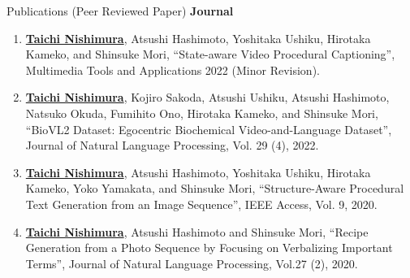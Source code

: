 \begin{rSection}{Publications (Peer Reviewed Paper)} 
{\bf Journal}
\vspace{-0.15cm}
\begin{enumerate}
    \item \underline{{\bf Taichi Nishimura}}, Atsushi Hashimoto, Yoshitaka Ushiku, Hirotaka Kameko, and Shinsuke Mori, ``State-aware Video Procedural Captioning'', Multimedia Tools and Applications 2022 (Minor Revision).
    \item \underline{{\bf Taichi Nishimura}}, Kojiro Sakoda, Atsushi Ushiku, Atsushi Hashimoto, Natsuko Okuda, Fumihito Ono, Hirotaka Kameko, and Shinsuke Mori, ``BioVL2 Dataset: Egocentric Biochemical Video-and-Language Dataset'', Journal of Natural Language Processing, Vol. 29 (4), 2022.
    \item \underline{{\bf Taichi Nishimura}}, Atsushi Hashimoto, Yoshitaka Ushiku, Hirotaka Kameko, Yoko Yamakata, and Shinsuke Mori, ``Structure-Aware Procedural Text Generation from an Image Sequence'', IEEE Access, Vol. 9, 2020.
    \item \underline{{\bf Taichi Nishimura}}, Atsushi Hashimoto and Shinsuke Mori, ``Recipe Generation from a Photo Sequence by Focusing on Verbalizing Important Terms'', Journal of Natural Language Processing, Vol.27 (2), 2020.
\end{enumerate}


\end{rSection}
